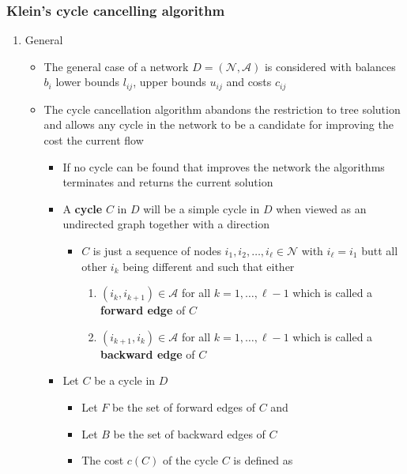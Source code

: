 \documentclass[11pt]{article}
\begin{document}
\subsubsection{Klein's cycle cancelling algorithm}
\label{sec:org46cfa48}
\begin{enumerate}
\item General
\label{sec:org262341b}
\begin{itemize}
\item The general case of a network \(D= (\mathcal N, \mathcal A)\) is considered with balances \(b_i\) lower bounds \(l_{ij}\), upper bounds \(u_{ij}\) and costs \(c_{ij}\)

\item The cycle cancellation algorithm abandons the restriction to tree solution and allows any cycle in the network to be a candidate for improving the cost the current flow
\begin{itemize}
\item If no cycle can be found that improves the network the algorithms terminates and returns the current solution
\item A \textbf{cycle} \(C\) in \(D\) will be a simple cycle in \(D\) when viewed as an undirected graph together with a direction
\begin{itemize}
\item \(C\) is just a sequence of nodes \(i_1,i_2,\dots,i_\ell \in \mathcal N\) with \(i_\ell = i_1\) butt all other \(i_k\) being different and such that either
\begin{enumerate}
\item \((i_k,i_{k+1}) \in \mathcal A\) for all \(k=1, \dots, \ell-1\) which is called a \textbf{forward edge} of \(C\)
\item \((i_{k+1}, i_k) \in \mathcal A\) for all \(k=1, \dots, \ell-1\) which is called a \textbf{backward edge} of \(C\)
\end{enumerate}
\end{itemize}
\item Let \(C\) be a cycle in \(D\)
\begin{itemize}
\item Let \(F\) be the set of forward edges of \(C\) and
\item Let \(B\) be the set of backward edges of \(C\)
\item The cost \(c(C)\) of the cycle \(C\) is defined as
\end{itemize}
\end{itemize}
\end{itemize}

\end{enumerate}
\end{document}
